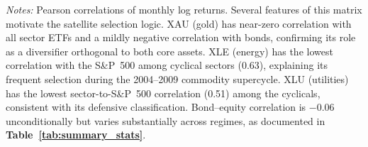 \documentclass[12pt, a4paper]{article}
\begin{document}
\begin{table}[H]
\centering
\caption{Pairwise Correlation Matrix of Monthly Log Returns (Feb 2004 -- Jan 2026)}
\label{tab:correlations}
\setlength{\tabcolsep}{3.5pt}
\footnotesize
{}
\begin{minipage}{\linewidth}
\vspace{4pt}\footnotesize
\textit{Notes:} Pearson correlations of monthly log returns. Several features of this matrix motivate the satellite selection logic. XAU (gold) has near-zero correlation with all sector ETFs and a mildly negative correlation with bonds, confirming its role as a diversifier orthogonal to both core assets. XLE (energy) has the lowest correlation with the S\&P~500 among cyclical sectors (0.63), explaining its frequent selection during the 2004--2009 commodity supercycle. XLU (utilities) has the lowest sector-to-S\&P~500 correlation (0.51) among the cyclicals, consistent with its defensive classification. Bond--equity correlation is $-0.06$ unconditionally but varies substantially across regimes, as documented in \textbf{Table~\ref{tab:summary_stats}}.
\end{minipage}
\end{table}
\end{document}
